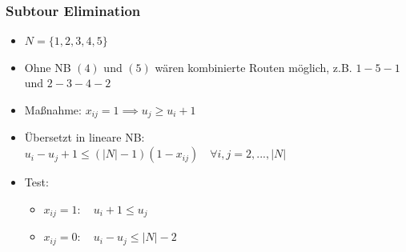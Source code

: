 \documentclass{beamer}
\begin{document}
\begin{frame}
  \frametitle{Subtour Elimination}
  \begin{itemize}
    \item $N = \{1, 2, 3, 4, 5\}$
    \item Ohne NB $(4)$ und $(5)$ wären kombinierte Routen möglich, z.B.\newline
    $1-5-1$ und $2-3-4-2$
    \item Maßnahme: $x_{ij} = 1 \implies u_j \geq u_i + 1$
    \item Übersetzt in lineare NB: $u_i - u_j + 1 \leq (|N| - 1)(1 - x_{ij}) \quad \forall i, j = 2, ..., |N|$
    \item Test:
    \begin{itemize}
      \item $x_{ij} = 1: \quad u_i + 1 \leq u_j$ \checkmark
      \item $x_{ij} = 0: \quad u_i - u_j \leq |N| - 2$ \checkmark
    \end{itemize}
  \end{itemize}
\end{frame}
\end{document}
